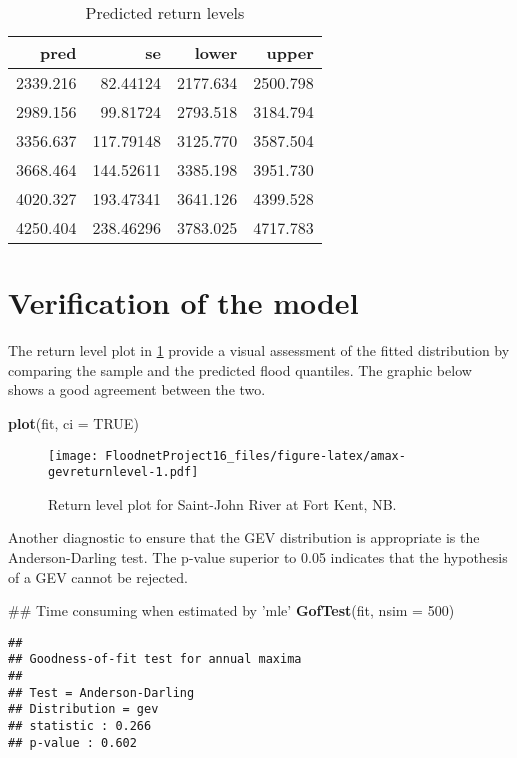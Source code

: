 \documentclass[]{book}
\newenvironment{Shaded}{\begin{snugshade}}{\end{snugshade}}
\newcommand{\DataTypeTok}[1]{\textcolor[rgb]{0.13,0.29,0.53}{#1}}
\newcommand{\DecValTok}[1]{\textcolor[rgb]{0.00,0.00,0.81}{#1}}
\newcommand{\KeywordTok}[1]{\textcolor[rgb]{0.13,0.29,0.53}{\textbf{#1}}}
\newcommand{\NormalTok}[1]{#1}
\newcommand{\OtherTok}[1]{\textcolor[rgb]{0.56,0.35,0.01}{#1}}
\theoremstyle{definition}
\theoremstyle{definition}
\theoremstyle{definition}
\theoremstyle{remark}
\begin{document}
\begin{table}

\caption{\label{tab:amax-yhat}Predicted return levels}
\centering
\begin{tabular}[t]{r|r|r|r}
\hline
pred & se & lower & upper\\
\hline
2339.216 & 82.44124 & 2177.634 & 2500.798\\
\hline
2989.156 & 99.81724 & 2793.518 & 3184.794\\
\hline
3356.637 & 117.79148 & 3125.770 & 3587.504\\
\hline
3668.464 & 144.52611 & 3385.198 & 3951.730\\
\hline
4020.327 & 193.47341 & 3641.126 & 4399.528\\
\hline
4250.404 & 238.46296 & 3783.025 & 4717.783\\
\hline
\end{tabular}
\end{table}

\hypertarget{verification-of-the-model}{%
\section{Verification of the model}\label{verification-of-the-model}}

The return level plot in \ref{fig:amax-gevreturnlevel} provide a visual
assessment of the fitted distribution by comparing the sample and the
predicted flood quantiles. The graphic below shows a good agreement
between the two.

\begin{Shaded}
\begin{Highlighting}[]
\KeywordTok{plot}\NormalTok{(fit, }\DataTypeTok{ci =} \OtherTok{TRUE}\NormalTok{)}
\end{Highlighting}
\end{Shaded}

\begin{figure}
\centering
\texttt{[image: FloodnetProject16\_files/figure-latex/amax-gevreturnlevel-1.pdf]}
\caption{\label{fig:amax-gevreturnlevel}Return level plot for Saint-John
River at Fort Kent, NB.}
\end{figure}

Another diagnostic to ensure that the GEV distribution is appropriate is
the Anderson-Darling test. The p-value superior to 0.05 indicates that
the hypothesis of a GEV cannot be rejected.

\begin{Shaded}
\begin{Highlighting}[]
\NormalTok{## Time consuming when estimated by 'mle'}
\KeywordTok{GofTest}\NormalTok{(fit, }\DataTypeTok{nsim =} \DecValTok{500}\NormalTok{)}
\end{Highlighting}
\end{Shaded}

\begin{verbatim}
## 
## Goodness-of-fit test for annual maxima
##  
## Test = Anderson-Darling 
## Distribution = gev
## statistic : 0.266 
## p-value : 0.602
\end{verbatim}


\end{document}
